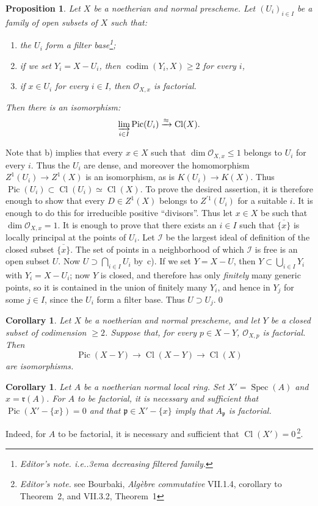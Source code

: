 \documentclass[11pt,a4paper,oneside]{book}
\providecommand{\sisi}[2]{#2}
\providecommand{\pageoriginale}{%
  \refstepcounter{pageoriginal}%
  \marginpar{\raggedright\footnotesize\bfseries\thepageoriginal}%
  \xspace}
\providecommand{\nde}[1]{\footnote{\textit{Editor's note.} #1}}
\providecommand{\og}{``}
\providecommand{\fg}{''\xspace}
\providecommand{\ie}{i.e.\kern.3em}
\providecommand{\quoi}{}
\providecommand{\Ii}{\mathcal I}
\providecommand{\Oo}{\mathcal O}
\providecommand{\ideal}[1]{\mathfrak{#1}}
\providecommand{\pp}{\ideal p}
\providecommand{\rr}{\ideal r}
\providecommand{\OXx}{\mathcal O_{X,x}}
\providecommand{\Spec}{\operatorname{Spec}}
\providecommand{\Pic}{\operatorname{Pic}}
\providecommand{\Cl}{\operatorname{Cl}}
\providecommand{\codim}{\operatorname{codim}}
\providecommand{\lto}[1]{\xrightarrow{#1}}
\let\pageoriginaled\pageoriginale
\newenvironment{enumeratea}
  {\begin{enumerate}[label=\alph*)]}
  {\end{enumerate}}
\theoremstyle{plain}
\newtheorem{corollaire}[subsection]{Corollary}
\newtheorem{propositionblah}[subsection]{Proposition}
\theoremstyle{definition}
\theoremstyle{remark}
\begin{document}
\begin{propositionblah} \label{XI.3.7.1}
Let $X$ be a noetherian and normal prescheme. Let $(U_i)_{i\in I}$ be a family of open subsets of $X$ such that:
\begin{enumeratea}
\item
the $U_i$ form a filter base\nde{\ie a decreasing filtered family.};
\item
if we set $Y_i=X-U_i$, then $\codim(Y_i, X)\geq 2$ for every $i$,
\item
if $x\in U_i$ for every $i\in I$, then $\OXx$ is factorial.
\end{enumeratea}
\noindent
Then there is an isomorphism:
\[
\varinjlim_{i\in I}\Pic(U_i)\lto{\approx}\Cl(X){\quoi}.
\]
\end{propositionblah} Note that b) implies that every $x\in X$ such that $\dim\OXx\leq 1$ belongs to $U_i$ for every $i$. Thus the $U_i$ are dense, and moreover the homomorphism $Z^1(U_i)\to Z^1(X)$ is an isomorphism, as is $K(U_i)\to K(X)$. Thus $\Pic(U_i)\subset \Cl(U_i) \simeq \Cl(X)$. To prove the desired assertion, it is therefore enough to show that every $D\in Z^1(X)$ belongs to $Z^{\prime1}(U_i)$ for a suitable $i$. It is enough to do this for irreducible positive \og divisors\fg. Thus let $x\in X$ be such that\pageoriginaled $\dim\OXx=1$. It is enough to prove that there exists an $i\in I$ such that $\overline{\{x\}}$ is locally principal at the points of $U_i$. Let $\Ii$ be the largest ideal of definition of the closed subset $\overline{\{x\}}$. The set of points in a neighborhood of which $\Ii$ is free is an open subset $U$. Now $U\supset \bigcap_{i\in I}U_i$ by~c). If we set $Y=X-U$, then $Y\subset \bigcup_{i\in I}Y_i$\sisi{}{ with $Y_i=X-U_i$}; now $Y$ is closed, and therefore has only \emph{finitely} many generic points, so it is contained in the union of finitely many $Y_i$, and hence in $Y_j$ for some $j\in I$, since the $U_i$ form a filter base. Thus $U\supset U_j$.\qed

\begin{corollaire} \label{XI.3.8}
Let $X$ be a noetherian and normal prescheme, and let $Y$ be a closed subset of codimension $\geq 2$. Suppose that, for every $p\in X-Y$, $\Oo_{X, p}$ is factorial. Then
\[
\Pic(X-Y)\to\Cl(X-Y)\to\Cl(X)
\]
are isomorphisms.
\end{corollaire}

\begin{corollaire} \label{XI.3.9}
Let $A$ be a noetherian normal local ring. Set $X'=\Spec(A)$ and $x = \rr(A)$. For $A$ to be \emph{factorial}, it is necessary and sufficient that $\Pic(X'-\{x\})=0$ and that $\pp\in X'-\{x\}$ imply that $A_\pp$ is factorial.
\end{corollaire}
Indeed, for $A$ to be factorial, it is necessary and sufficient that $\Cl(X')=0$\,\nde{see Bourbaki, \emph{Alg\`ebre commutative} VII.1.4, corollary to Theorem~2, and VII.3.2, Theorem~1}.
\end{document}
